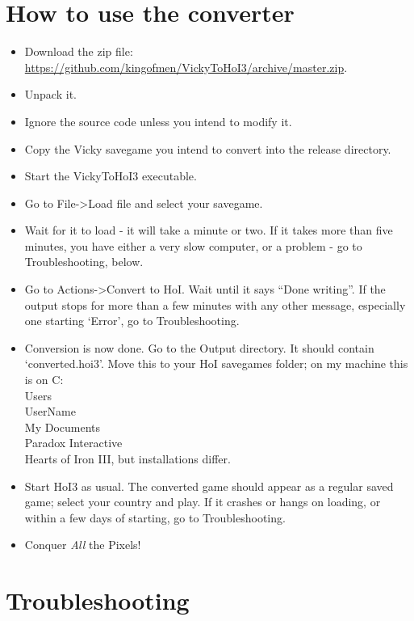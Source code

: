 \documentclass[12pt,ebook,oneside]{book}
\begin{document}
\section{How to use the converter}

\begin{itemize}
\item Download the zip file: \url{https://github.com/kingofmen/VickyToHoI3/archive/master.zip}.
\item Unpack it. 
\item Ignore the source code unless you intend to modify it. 
\item Copy the Vicky savegame you intend to convert into the release
  directory. 
\item Start the VickyToHoI3 executable. 
\item Go to File->Load file and select your savegame. 
\item Wait for it to load - it will take a minute or two. If it takes
  more than five minutes, you have either a very slow computer, or a
  problem - go to Troubleshooting, below. 
\item Go to Actions->Convert to HoI. Wait until it says ``Done
  writing''. If the output stops for more than a few minutes with any
  other message, especially one starting `Error', go to
  Troubleshooting. 
\item Conversion is now done. Go to the Output directory. It should
  contain `converted.hoi3'. Move this to your HoI savegames folder; on
  my machine this is on C:\\Users\\UserName\\My Documents\\Paradox
  Interactive\\Hearts of Iron III, but installations differ. 
\item Start HoI3 as usual. The converted game should appear as a
  regular saved game; select your country and play. If it crashes or
  hangs on loading, or within a few days of starting, go to
  Troubleshooting. 
\item Conquer \emph{All} the Pixels! 
\end{itemize}

\section{Troubleshooting}
\end{document}
